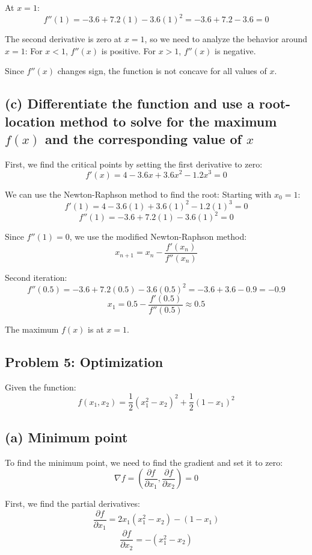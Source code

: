 \documentclass[12pt]{article}
\begin{document}
At \(x = 1\):
\[
f''(1) = -3.6 + 7.2(1) - 3.6(1)^2 = -3.6 + 7.2 - 3.6 = 0
\]

The second derivative is zero at \(x = 1\), so we need to analyze the behavior around \(x = 1\):
For \(x < 1\), \(f''(x)\) is positive.
For \(x > 1\), \(f''(x)\) is negative.

Since \(f''(x)\) changes sign, the function is not concave for all values of \(x\).

\subsection*{(c) Differentiate the function and use a root-location method to solve for the maximum \(f(x)\) and the corresponding value of \(x\)}

First, we find the critical points by setting the first derivative to zero:
\[
f'(x) = 4 - 3.6x + 3.6x^2 - 1.2x^3 = 0
\]

We can use the Newton-Raphson method to find the root:
Starting with \(x_0 = 1\):
\[
f'(1) = 4 - 3.6(1) + 3.6(1)^2 - 1.2(1)^3 = 0
\]
\[
f''(1) = -3.6 + 7.2(1) - 3.6(1)^2 = 0
\]

Since \(f''(1) = 0\), we use the modified Newton-Raphson method:
\[
x_{n+1} = x_n - \frac{f'(x_n)}{f''(x_n)}
\]

Second iteration:
\[
f''(0.5) = -3.6 + 7.2(0.5) - 3.6(0.5)^2 = -3.6 + 3.6 - 0.9 = -0.9
\]
\[
x_1 = 0.5 - \frac{f'(0.5)}{f''(0.5)} \approx 0.5
\]

The maximum \(f(x)\) is at \(x = 1\).

\subsection*{Problem 5: Optimization}

Given the function:
\[
f(x_1, x_2) = \frac{1}{2}(x_1^2 - x_2)^2 + \frac{1}{2}(1 - x_1)^2
\]

\subsection*{(a) Minimum point}

To find the minimum point, we need to find the gradient and set it to zero:
\[
\nabla f = \left( \frac{\partial f}{\partial x_1}, \frac{\partial f}{\partial x_2} \right) = 0
\]

First, we find the partial derivatives:
\[
\frac{\partial f}{\partial x_1} = 2x_1(x_1^2 - x_2) - (1 - x_1)
\]
\[
\frac{\partial f}{\partial x_2} = -(x_1^2 - x_2)
\]
\end{document}
